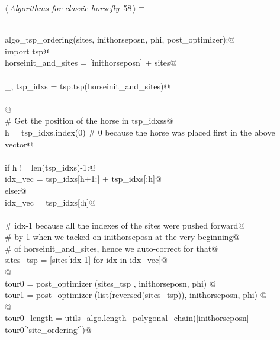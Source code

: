 \documentclass[11.5pt]{report}
\begin{document}
\begin{flushleft} \small\label{scrap80}\raggedright\small
{} $\langle\,${\itshape Algorithms for classic horsefly}\nobreak\ {\footnotesize {58}}$\,\rangle\equiv$
\vspace{-1ex}
\begin{list}{}{} \item
\mbox{}\verb@@\\
\mbox{}\verb@def algo_tsp_ordering(sites, inithorseposn, phi, post_optimizer):@\\
\mbox{}\verb@    import tsp@\\
\mbox{}\verb@    horseinit_and_sites = [inithorseposn] + sites@\\
\mbox{}\verb@@\\
\mbox{}\verb@    _, tsp_idxs = tsp.tsp(horseinit_and_sites)@\\
\mbox{}\verb@@\\
\mbox{}\verb@          @\\
\mbox{}\verb@    # Get the position of the horse in tsp_idxss@\\
\mbox{}\verb@    h = tsp_idxs.index(0) # 0 because the horse was placed first in the above vector@\\
\mbox{}\verb@@\\
\mbox{}\verb@    if h != len(tsp_idxs)-1:@\\
\mbox{}\verb@        idx_vec = tsp_idxs[h+1:] + tsp_idxs[:h]@\\
\mbox{}\verb@    else:@\\
\mbox{}\verb@        idx_vec = tsp_idxs[:h]@\\
\mbox{}\verb@@\\
\mbox{}\verb@    # idx-1 because all the indexes of the sites were pushed forward@\\
\mbox{}\verb@    # by 1 when we tacked on inithorseposn at the very beginning@\\
\mbox{}\verb@    # of horseinit_and_sites, hence we auto-correct for that@\\
\mbox{}\verb@    sites_tsp = [sites[idx-1] for idx in idx_vec]@\\
\mbox{}\verb@    @\\
\mbox{}\verb@    tour0    = post_optimizer (sites_tsp                , inithorseposn, phi) @\\
\mbox{}\verb@    tour1    = post_optimizer (list(reversed(sites_tsp)), inithorseposn, phi) @\\
\mbox{}\verb@    @\\
\mbox{}\verb@    tour0_length = utils_algo.length_polygonal_chain([inithorseposn] + tour0['site_ordering'])@\\

\end{list}
\end{flushleft}
\end{document}
